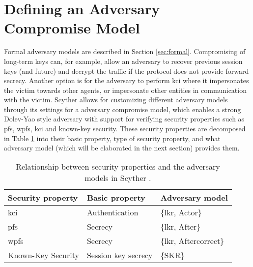 \section{Defining an Adversary Compromise Model}


Formal adversary models are described in Section \ref{sec:formal}. Compromising of long-term keys can, for example, allow an adversary to recover previous session keys (and future) and decrypt the traffic if the protocol does not provide forward secrecy. Another option is for the adversary to perform \gls{kci} where it impersonates the victim towards other agents, or impersonate other entities in communication with the victim. Scyther allows for customizing different adversary models through its settings for a adversary compromise model, which enables a strong Dolev-Yao style adversary with support for verifying security properties such as \gls{pfs}, \gls{wpfs}, \gls{kci} and known-key security. These security properties are decomposed in Table \ref{tab:sec-prop-adv-mod} into their basic property, type of security property, and what adversary model (which will be elaborated in the next section) provides them.

\begin{table}[h]
\centering
\begin{tabular}{|l|l|l|}
\hline
Security property                   & Basic property           & Adversary model    			\\ \hline
\gls{kci} 							 & Authentication           & \{\gls{lkr}, Actor\}        	\\ \hline
\gls{pfs}      						 & Secrecy                  & \{\gls{lkr}, After\}        \\ \hline
\gls{wpfs} 						     & Secrecy                  & \{\gls{lkr}, Aftercorrect\} \\ \hline
Known-Key Security                  & Session key secrecy 		 & \{SKR\}                		\\ \hline
\end{tabular}
\caption{Relationship between security properties and the adversary models in Scyther \cite{basin2010modeling}.}
\label{tab:sec-prop-adv-mod}
\end{table}

\newpage

